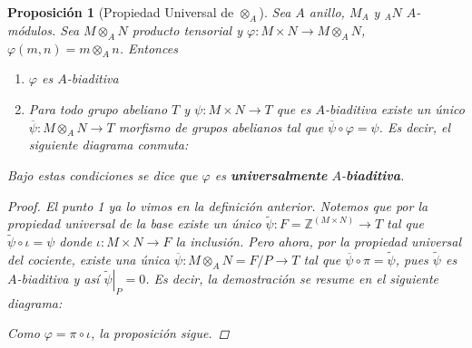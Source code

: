 \documentclass[12pt]{book}
\newtheorem{prop}[teo]{Proposición}
\theoremstyle{definition}
\newcommand{\ZZ}{\mathbb{Z}}      %
\begin{document}
\begin{prop}[Propiedad Universal de $\otimes_A$]
Sea $A$ anillo, $M_A$ y $_AN$ $A$-módulos. Sea $M\otimes_A N$ producto tensorial y $\varphi:M\times N\to M\otimes_A N$, $\varphi(m,n)=m\otimes_A n$. Entonces \begin{enumerate}\item $\varphi$ es $A$-biaditiva \item Para todo grupo abeliano $T$ y $\psi:M\times N\to T$ que es $A$-biaditiva existe un único $\overline{\psi}:M\otimes_A N\to T$ morfismo de grupos abelianos tal que $\overline{\psi}\circ \varphi = \psi$. Es decir, el siguiente diagrama conmuta: \end{enumerate}

Bajo estas condiciones se dice que $\varphi$ es \textbf{universalmente} $A$-\textbf{biaditiva}.
\begin{proof}
El punto \textit{1} ya lo vimos en la definición anterior. Notemos que por la propiedad universal de la base existe un único $\tilde{\psi}:F=\ZZ^{(M\times N)}\to T$ tal que $\tilde{\psi}\circ \iota = \psi$ donde $\iota:M\times N\to F$ la inclusión. Pero ahora, por la propiedad universal del cociente, existe una única $\overline{\psi}:M\otimes_A N = F/P \to T$ tal que $\overline{\psi}\circ \pi = \tilde{\psi}$, pues $\tilde{\psi}$ es $A$-biaditiva y así $\left.\tilde{\psi}\right|_P = 0$. Es decir, la demostración se resume en el siguiente diagrama:
Como $\varphi = \pi\circ\iota$, la proposición sigue.

\end{proof}
\end{prop}
\end{document}
